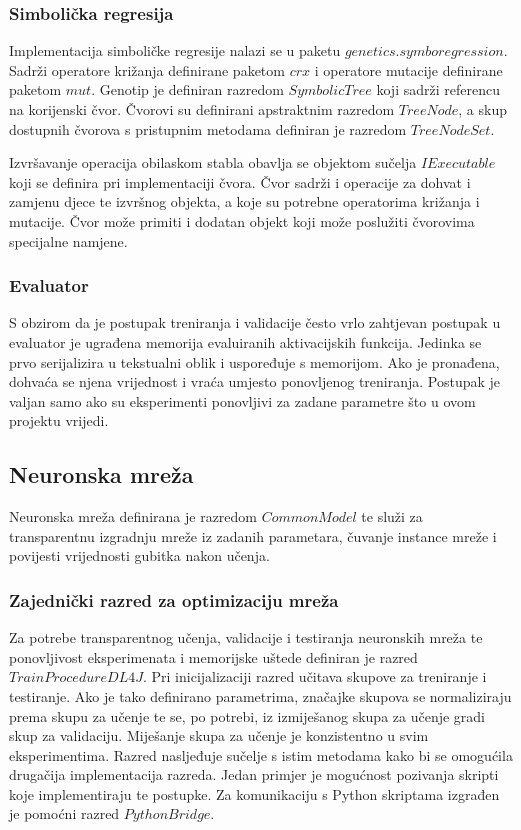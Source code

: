 \documentclass[times, utf8, numeric, diplomski]{fer}
\begin{document}
\subsubsection{Simbolička regresija}
Implementacija simboličke regresije nalazi se u paketu $genetics.symboregression$. Sadrži operatore križanja definirane paketom $crx$ i operatore mutacije definirane paketom $mut$. Genotip je definiran razredom $SymbolicTree$ koji sadrži referencu na korijenski čvor. Čvorovi su definirani apstraktnim razredom $TreeNode$, a skup dostupnih čvorova s pristupnim metodama definiran je razredom $TreeNodeSet$.

Izvršavanje operacija obilaskom stabla obavlja se objektom sučelja $IExecutable$ koji se definira pri implementaciji čvora. Čvor sadrži i operacije za dohvat i zamjenu djece te izvršnog objekta, a koje su potrebne operatorima križanja i mutacije. Čvor može primiti i dodatan objekt koji može poslužiti čvorovima specijalne namjene.

\subsubsection{Evaluator}
S obzirom da je postupak treniranja i validacije često vrlo zahtjevan postupak u evaluator je ugrađena memorija evaluiranih aktivacijskih funkcija. Jedinka se prvo serijalizira u tekstualni oblik i uspoređuje s memorijom. Ako je pronađena, dohvaća se njena vrijednost i vraća umjesto ponovljenog treniranja. Postupak je valjan samo ako su eksperimenti ponovljivi za zadane parametre što u ovom projektu vrijedi.

\subsection{Neuronska mreža}
Neuronska mreža definirana je razredom $CommonModel$ te služi za transparentnu izgradnju mreže iz zadanih parametara, čuvanje instance mreže i povijesti vrijednosti gubitka nakon učenja.

\subsubsection{Zajednički razred za optimizaciju mreža}
Za potrebe transparentnog učenja, validacije i testiranja neuronskih mreža te ponovljivost eksperimenata i memorijske uštede definiran je razred $TrainProcedureDL4J$. Pri inicijalizaciji razred učitava skupove za treniranje i testiranje. Ako je tako definirano parametrima, značajke skupova se normaliziraju prema skupu za učenje te se, po potrebi, iz izmiješanog skupa za učenje gradi skup za validaciju. Miješanje skupa za učenje je konzistentno u svim eksperimentima.
Razred nasljeđuje sučelje s istim metodama kako bi se omogućila drugačija implementacija razreda. Jedan primjer je mogućnost pozivanja skripti koje implementiraju te postupke. Za komunikaciju s Python skriptama izgrađen je pomoćni razred $PythonBridge$.
\end{document}
